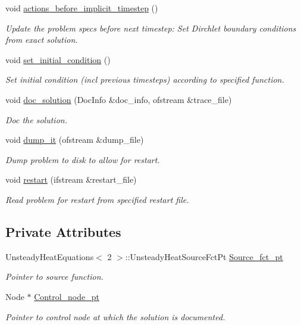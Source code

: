 \begin{DoxyCompactItemize}
void \hyperlink{classUnsteadyHeatProblem_a7074e52f6a3a791549687e1b4ddd059a}{actions\+\_\+before\+\_\+implicit\+\_\+timestep} ()
\begin{DoxyCompactList}\small\item\em Update the problem specs before next timestep\+: Set Dirchlet boundary conditions from exact solution. \end{DoxyCompactList}\item 
void \hyperlink{classUnsteadyHeatProblem_a98de3ed2d9cf5409323121bbb482bc1b}{set\+\_\+initial\+\_\+condition} ()
\begin{DoxyCompactList}\small\item\em Set initial condition (incl previous timesteps) according to specified function. \end{DoxyCompactList}\item 
void \hyperlink{classUnsteadyHeatProblem_a2c0c4b762d2dbde7396dca2a6750f433}{doc\+\_\+solution} (Doc\+Info \&doc\+\_\+info, ofstream \&trace\+\_\+file)
\begin{DoxyCompactList}\small\item\em Doc the solution. \end{DoxyCompactList}\item 
void \hyperlink{classUnsteadyHeatProblem_a9a60874a6471414819301705f1a2afd1}{dump\+\_\+it} (ofstream \&dump\+\_\+file)
\begin{DoxyCompactList}\small\item\em Dump problem to disk to allow for restart. \end{DoxyCompactList}\item 
void \hyperlink{classUnsteadyHeatProblem_ad0a4a1c1da24f6d62f64b0d40be31709}{restart} (ifstream \&restart\+\_\+file)
\begin{DoxyCompactList}\small\item\em Read problem for restart from specified restart file. \end{DoxyCompactList}\end{DoxyCompactItemize}
\subsection*{Private Attributes}
\begin{DoxyCompactItemize}
\item 
Unsteady\+Heat\+Equations$<$ 2 $>$\+::Unsteady\+Heat\+Source\+Fct\+Pt \hyperlink{classUnsteadyHeatProblem_a923d1a0bd45b1cd747a5b4558ae3f190}{Source\+\_\+fct\+\_\+pt}
\begin{DoxyCompactList}\small\item\em Pointer to source function. \end{DoxyCompactList}\item 
Node $\ast$ \hyperlink{classUnsteadyHeatProblem_ac0cf04bd0b915f02b171fd50cae13874}{Control\+\_\+node\+\_\+pt}
\begin{DoxyCompactList}\small\item\em Pointer to control node at which the solution is documented. \end{DoxyCompactList}\end{DoxyCompactItemize}


